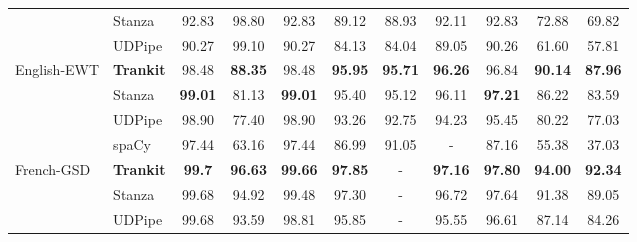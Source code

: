 \documentclass[11pt,a4paper]{article}
\begin{document}
\begin{table*}[ht]
{\begin{tabular}{l|l|c|c|c|c|c|c|c|c|c}
                                        & Stanza                      & 92.83          & 98.80          & 92.83          & 89.12          & 88.93          & 92.11          & 92.83          & 72.88          & 69.82          \\ \cline{2-11} 
                                        & UDPipe                      & 90.27          & 99.10          & 90.27          & 84.13          & 84.04          & 89.05          & 90.26          & 61.60          & 57.81          \\ \hline
\multirow{4}{*}{English-EWT}            & {\bf Trankit}                     & 98.48          & \textbf{88.35} & 98.48          & \textbf{95.95} & \textbf{95.71} & \textbf{96.26} & 96.84          & \textbf{90.14} & \textbf{87.96} \\ \cline{2-11} 
                                        & Stanza                      & \textbf{99.01} & 81.13          & \textbf{99.01} & 95.40          & 95.12          & 96.11          & \textbf{97.21} & 86.22          & 83.59          \\ \cline{2-11} 
                                        & UDPipe                      & 98.90          & 77.40          & 98.90          & 93.26          & 92.75          & 94.23          & 95.45          & 80.22          & 77.03          \\ \cline{2-11} 
                                        & spaCy   & 97.44                               & 63.16                               & 97.44                               & 86.99                               & 91.05                               & -                                   & 87.16                               & 55.38                               & 37.03                               \\ \hline
\multirow{4}{*}{French-GSD}             & {\bf Trankit}                     & \textbf{99.7}  & \textbf{96.63} & \textbf{99.66} & \textbf{97.85} & -              & \textbf{97.16} & \textbf{97.80} & \textbf{94.00} & \textbf{92.34} \\ \cline{2-11} 
                                        & Stanza                      & 99.68          & 94.92          & 99.48          & 97.30          & -              & 96.72          & 97.64          & 91.38          & 89.05          \\ \cline{2-11} 
                                        & UDPipe                      & 99.68          & 93.59          & 98.81          & 95.85          & -              & 95.55          & 96.61          & 87.14          & 84.26          \\ \cline{2-11} 

\end{tabular}}
\end{table*}
\end{document}
